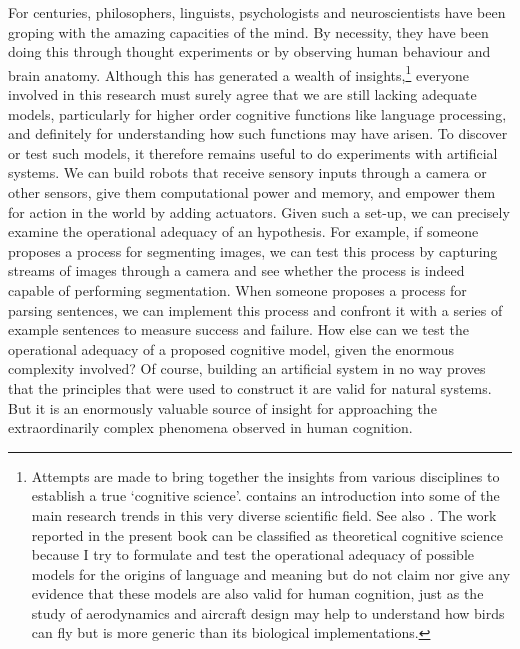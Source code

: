 For centuries, philosophers, linguists, psychologists and 
neuroscientists have been groping with the amazing capacities
of the mind. By necessity, they have been doing this through
thought experiments or by observing human behaviour and
brain anatomy. Although this has generated a wealth
of insights,\footnote{Attempts are made to bring together the insights from various
disciplines to establish a true `cognitive science'. 
\cite{Osherton:1995} contains an introduction into some of the main 
research trends in this very diverse scientific field. 
See also \cite{Luger:1994}. The work reported in the present book can be 
classified as theoretical
cognitive science because I try to formulate and test
the operational adequacy of possible models for the 
origins of language and meaning but do not claim nor
give any evidence that these models are also valid for
human cognition, just as the study of aerodynamics and 
aircraft design may help to understand how birds can 
fly but is more generic than its biological 
implementations.}
everyone involved in this research must surely 
agree that we are still lacking adequate models, 
particularly for higher order cognitive functions like language
processing, and definitely for understanding how such 
functions may have arisen. 
To discover or test such models, it therefore
remains useful to do experiments with artificial systems.
We can build robots that receive sensory inputs
through a camera or other sensors, give them computational 
power and memory, and empower them 
for action in the world by adding actuators. Given such a 
set-up, we can precisely examine the operational adequacy 
of an hypothesis. For example, if someone proposes
a process for segmenting images, we can test this process 
by capturing streams of images through a camera and 
see whether the process is indeed capable of performing 
segmentation. When someone proposes a process 
for parsing sentences, we 
can implement this process and confront it with a series of 
example sentences to measure success and failure. 
How else can we test the operational adequacy of a proposed
cognitive model, given the enormous complexity involved? 
Of course, building an artificial system in no way proves
that the principles that were used to construct it are valid
for natural systems. But it is an enormously valuable 
source of insight for approaching the extraordinarily 
complex phenomena observed in human cognition. 


